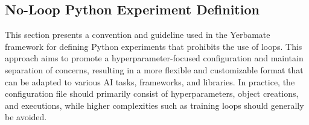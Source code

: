 \subsection{No-Loop Python Experiment Definition}

This section presents a convention and guideline used in the Yerbamate framework for defining Python experiments that prohibits the use of loops. This approach aims to promote a hyperparameter-focused configuration and maintain separation of concerns, resulting in a more flexible and customizable format that can be adapted to various AI tasks, frameworks, and libraries. In practice, the configuration file should primarily consist of hyperparameters, object creations, and executions, while higher complexities such as training loops should generally be avoided.






